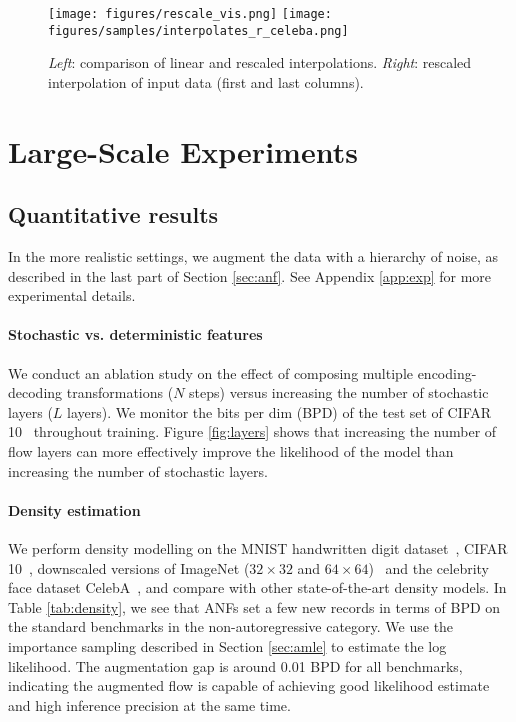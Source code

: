\documentclass{article}
\begin{document}
\begin{figure*}
    \centering
    \texttt{[image: figures/rescale\_vis.png]}
    \hfill
    \texttt{[image: figures/samples/interpolates\_r\_celeba.png]}
    \caption{\emph{Left}: comparison of linear and rescaled interpolations. \emph{Right}: rescaled interpolation of input data (first and last columns).}
    \label{fig:interpolate}
\end{figure*}



\section{Large-Scale Experiments}

\subsection{Quantitative results}
In the more realistic settings, we augment the data with a hierarchy of noise, as described in the last part of Section \ref{sec:anf}. 
See Appendix \ref{app:exp} for more experimental details. 

\paragraph{Stochastic vs. deterministic features} We conduct an ablation study on the effect of composing multiple encoding-decoding transformations ($N$ steps) versus increasing the number of stochastic layers ($L$ layers). 
We monitor the bits per dim (BPD) of the test set of CIFAR 10~\citep{krizhevsky2009learning} throughout training.
Figure \ref{fig:layers} shows that increasing the number of flow layers can more effectively improve the likelihood of the model than increasing the number of stochastic layers.

\paragraph{Density estimation}
We perform density modelling on the MNIST handwritten digit dataset~\citep{lecun1998gradient}, CIFAR 10~\citep{krizhevsky2009learning}, downscaled versions of ImageNet ($32\times32$ and $64\times64$)~\citep{oord2016pixel} and the celebrity face dataset CelebA~\citep{liu2015faceattributes}, and compare with other state-of-the-art density models.  
In Table \ref{tab:density}, we see that ANFs set a few new records in terms of BPD on the standard benchmarks in the non-autoregressive category.
We use the importance sampling described in Section \ref{sec:amle} to estimate the log likelihood. 
The augmentation gap is around 0.01 BPD for all benchmarks, indicating the augmented flow is capable of achieving good likelihood estimate and high inference precision at the same time. 
\end{document}
